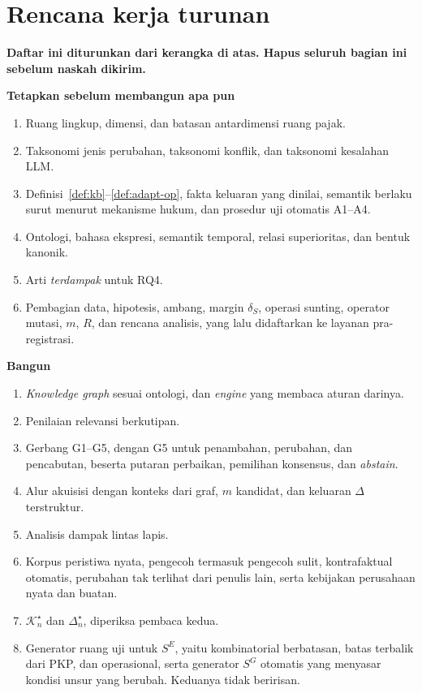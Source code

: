 \documentclass[journal,a4paper]{IEEEtran}
\newcommand{\en}[1]{\textit{#1}}
\newcommand{\K}{\mathcal{K}}
\newcommand{\emas}{\star}
\newcommand{\SG}{S^{G}}
\newcommand{\SE}{S^{E}}
\newif\ifrancangan \rancangantrue
\newcommand{\kotak}[3]{\ifrancangan\par\begingroup\scriptsize
  \def\FrameCommand{\fboxsep=3pt\fboxrule=0.4pt\fcolorbox{#1!60!black}{#1!6}}%
  \MakeFramed{\advance\hsize-\width\FrameRestore}\noindent\textbf{#2}\par #3\endMakeFramed\endgroup\fi}
\begin{document}
\section{Rencana kerja turunan}
\label{sec:rencana}
\ifrancangan
\kotak{gray}{Daftar ini diturunkan dari kerangka di atas. Hapus seluruh bagian ini sebelum naskah dikirim.}{
\textbf{Tetapkan sebelum membangun apa pun}
\begin{enumerate}[leftmargin=*,nosep]
  \item Ruang lingkup, dimensi, dan batasan antardimensi ruang pajak.
  \item Taksonomi jenis perubahan, taksonomi konflik, dan taksonomi kesalahan LLM.
  \item Definisi~\ref{def:kb}--\ref{def:adapt-op}, fakta keluaran yang dinilai, semantik berlaku surut menurut mekanisme hukum, dan prosedur uji otomatis A1--A4.
  \item Ontologi, bahasa ekspresi, semantik temporal, relasi superioritas, dan bentuk kanonik.
  \item Arti \emph{terdampak} untuk RQ4.
  \item Pembagian data, hipotesis, ambang, margin $\delta_S$, operasi sunting, operator mutasi, $m$, $R$, dan rencana analisis, yang lalu didaftarkan ke layanan pra-registrasi.
\end{enumerate}
\textbf{Bangun}
\begin{enumerate}[leftmargin=*,nosep]
  \item \en{Knowledge graph} sesuai ontologi, dan \en{engine} yang membaca aturan darinya.
  \item Penilaian relevansi berkutipan.
  \item Gerbang G1--G5, dengan G5 untuk penambahan, perubahan, dan pencabutan, beserta putaran perbaikan, pemilihan konsensus, dan \en{abstain}.
  \item Alur akuisisi dengan konteks dari graf, $m$ kandidat, dan keluaran $\Delta$ terstruktur.
  \item Analisis dampak lintas lapis.
  \item Korpus peristiwa nyata, pengecoh termasuk pengecoh sulit, kontrafaktual otomatis, perubahan tak terlihat dari penulis lain, serta kebijakan perusahaan nyata dan buatan.
  \item $\K^{\emas}_n$ dan $\Delta^{\emas}_n$, diperiksa pembaca kedua.
  \item Generator ruang uji untuk $\SE$, yaitu kombinatorial berbatasan, batas terbalik dari PKP, dan operasional, serta generator $\SG$ otomatis yang menyasar kondisi unsur yang berubah. Keduanya tidak beririsan.

\end{enumerate}}
\end{document}
